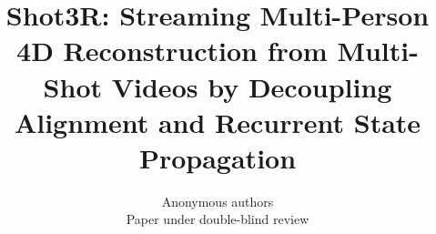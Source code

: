 \title{Shot3R: Streaming Multi-Person 4D Reconstruction from Multi-Shot Videos by Decoupling Alignment and Recurrent State Propagation}

\author{Anonymous authors\\
Paper under double-blind review}


\newcommand{\method}{\textsc{Shot3R}}
\newcommand{\humanthree}{\textsc{Human3R}}
\newcommand{\R}{\mathbb{R}}
\newcommand{\SE}{\mathrm{SE}}
\newcommand{\SO}{\mathrm{SO}}
